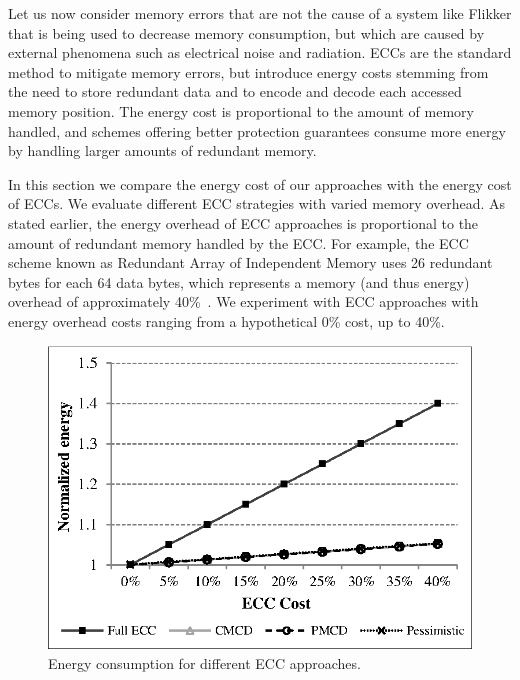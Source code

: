 \documentclass[letterpaper]{article}
\begin{document}
Let us now consider memory errors that are not the cause of a system like Flikker that is being used to decrease memory consumption, but which are caused by external phenomena such as electrical noise and radiation.
ECCs are the standard method to mitigate memory errors, but introduce energy costs stemming from the need to store redundant data and to encode and decode each accessed memory position. The energy cost is proportional to the amount of memory handled, and schemes offering better protection guarantees consume more energy by handling larger amounts of redundant memory. 



In this section we compare the energy cost of our approaches with the energy cost of ECCs. We evaluate different ECC strategies with varied memory overhead. As stated earlier, the energy overhead of ECC approaches is proportional to the amount of redundant memory handled by the ECC. For example, the ECC scheme known as Redundant Array of Independent Memory uses 26 redundant bytes for each 64 data bytes, which represents a memory (and thus energy) overhead of approximately 40\%~\cite{6136239}. We experiment with ECC approaches with energy overhead costs ranging from a hypothetical 0\% cost, up to 40\%. %

\begin{figure}[!t]
\centering
\includegraphics[scale=.8]{figures/ecc_chart.eps}
\caption{Energy consumption for different ECC approaches.}
\label{fig:ecc}
\end{figure}
\end{document}
